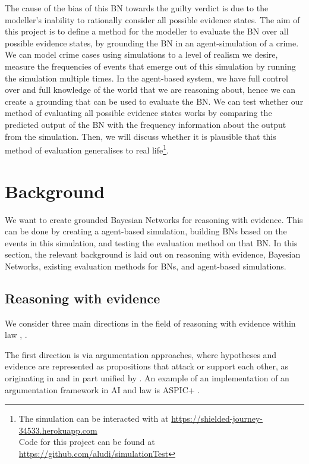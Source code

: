 \documentclass[11pt]{article}
\begin{document}
The cause of the bias of this BN towards the guilty verdict is due to the modeller's inability to rationally consider all possible evidence states. The aim of this project is to define a method for the modeller to evaluate the BN over all possible evidence states, by grounding the BN in an agent-simulation of a crime. We can model crime cases using simulations to a level of realism we desire, measure the frequencies of events that emerge out of this simulation by running the simulation multiple times. In the agent-based system, we have full control over and full knowledge of the world that we are reasoning about, hence we can create a grounding that can be used to evaluate the BN. We can test whether our method of evaluating all possible evidence states works by comparing the predicted output of the BN with the frequency information about the output from the simulation. Then, we will discuss whether it is plausible that this method of evaluation generalises to real life\footnote{The simulation can be interacted with at \url{https://shielded-journey-34533.herokuapp.com} \\ Code for this project can be found at \url{https://github.com/aludi/simulationTest}}.


\section{Background}

We want to create grounded Bayesian Networks for reasoning with evidence. This can be done by creating a agent-based simulation, building BNs based on the events in this simulation, and testing the evaluation method on that BN. In this section, the relevant background is laid out on reasoning with evidence, Bayesian Networks, existing evaluation methods for BNs, and agent-based simulations.


\subsection{Reasoning with evidence}
We consider three main directions in the field of reasoning with evidence within law \citep{Verheij2015}, \citep{diBelloVerheij2018}. 

The first direction is via argumentation approaches, where hypotheses and evidence are represented as propositions that attack or support each other, as originating in \citep{wigmore1931} and in part unified by \citet{dung1995} \citep{benchcapon2019}. An example of an implementation of an argumentation framework in AI and law is ASPIC+ \citep{prakkenEtal2013}. 
\end{document}
